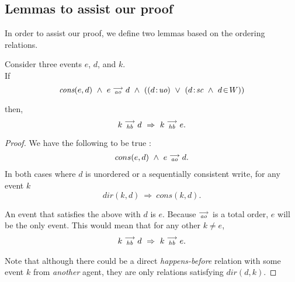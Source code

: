 \newcommand{\cons}[2]{\textit{cons}(#1,#2)}
  
    \subsection{Lemmas to assist our proof}    
    In order to assist our proof, we define two lemmas based on the ordering relations. 
    
    \begin{lemma} Consider three events $e$, $d$, and $k$. \\
    
        If
            \[
                \cons{e}{d} \ \wedge \ \reln{e}{ao}{d} \ \wedge \
                (
                    (\et{d}{uo}) \ \vee \
                    (\et{d}{sc} \ \wedge \ \event{d}{W})
                )
            \]
            
        then,
            \[
                \reln{k}{hb}{d}\ \Rightarrow\ \reln{k}{hb}{e}.
            \]
    \end{lemma}
    
    \begin{proof}
        We have the following to be true :
            \begin{align*}
                cons(e,d) \ \wedge \ e\stackrel{\longrightarrow}{_{\textit{ao}}}d.
            \end{align*}
        In both cases where $d$ is unordered or a sequentially consistent write, for any event $k$
        \[
            dir(k,d)\ \Rightarrow\ cons(k,d).
        \]
        
        An event that satisfies the above with $d$ is $e$. Because $\stackrel{\longrightarrow}{_\textit{ao}}$ is a total order, $e$ will be the only event. This would mean that for any other $k \neq e$,
        \begin{align*}
            k\stackrel{\longrightarrow}{_{\textit{hb}}}d\ \Rightarrow\ k\stackrel{\longrightarrow}{_{\textit{hb}}}e.
        \end{align*}
        
        Note that although there could be a direct \textit{happens-before} relation with some event $k$ from \textit{another} agent, they are only relations satisfying $dir(d,k)$.
        
    \end{proof}

    
